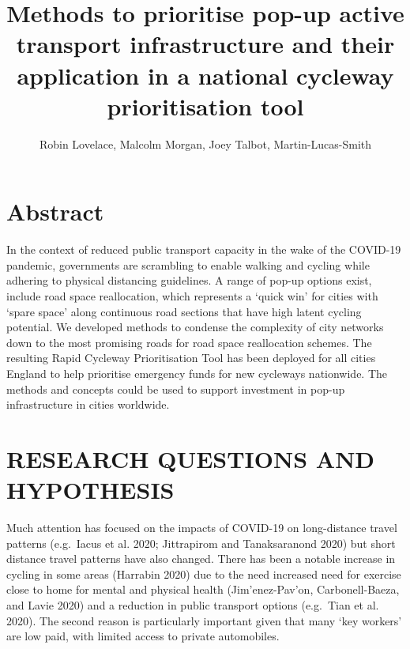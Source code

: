 \documentclass[
]{article}
\title{Methods to prioritise pop-up active transport infrastructure and their application in a national cycleway prioritisation tool}
\author{Robin Lovelace, Malcolm Morgan, Joey Talbot, Martin-Lucas-Smith}
\date{}
\begin{document}
\maketitle

{
\setcounter{tocdepth}{2}
\tableofcontents
}
\hypertarget{abstract}{%
\section{Abstract}\label{abstract}}

In the context of reduced public transport capacity in the wake of the COVID-19 pandemic, governments are scrambling to enable walking and cycling while adhering to physical distancing guidelines.
A range of pop-up options exist, include road space reallocation, which represents a `quick win' for cities with `spare space' along continuous road sections that have high latent cycling potential.
We developed methods to condense the complexity of city networks down to the most promising roads for road space reallocation schemes.
The resulting Rapid Cycleway Prioritisation Tool has been deployed for all cities England to help prioritise emergency funds for new cycleways nationwide.
The methods and concepts could be used to support investment in pop-up infrastructure in cities worldwide.

\hypertarget{research-questions-and-hypothesis}{%
\section{RESEARCH QUESTIONS AND HYPOTHESIS}\label{research-questions-and-hypothesis}}

Much attention has focused on the impacts of COVID-19 on long-distance travel patterns (e.g.~Iacus et al. 2020; Jittrapirom and Tanaksaranond 2020) but short distance travel patterns have also changed.
There has been a notable increase in cycling in some areas (Harrabin 2020) due to the need increased need for exercise close to home for mental and physical health (Jim\a'enez-Pav\a'on, Carbonell-Baeza, and Lavie 2020) and a reduction in public transport options (e.g.~Tian et al. 2020).
The second reason is particularly important given that many `key workers' are low paid, with limited access to private automobiles.
\end{document}
